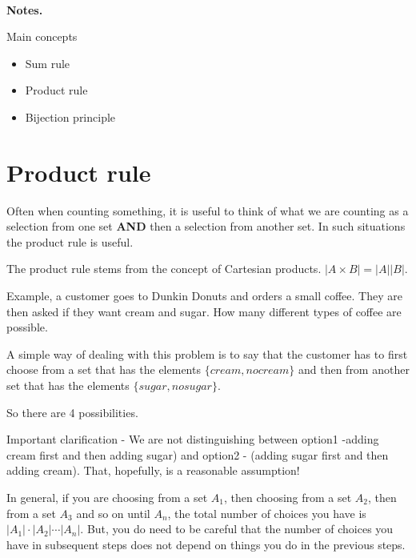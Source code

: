\documentclass[12pt]{article}
\begin{document}
\begin{center}
\\
\vspace{1cm}
\end{center}


\medskip\noindent

{\bf Notes.}

Main concepts

\begin{itemize}
\item Sum rule
\item Product rule
\item Bijection principle
\end{itemize}

\vspace{0.5cm}\noindent

\section*{Product rule}
Often when counting something, it is useful to think of what we are counting as a selection from one set \textbf{AND} then a selection from another set. In such situations the product rule is useful.

The product rule stems from the concept of Cartesian products. $|A \times B| = |A||B|$.
 
Example, a customer goes to Dunkin Donuts and orders a small coffee. They are then asked if they want cream and sugar. How many different types of coffee are possible.

A simple way of dealing with this problem is to say that the customer has to first choose from a set that has the elements $\{cream, no cream\}$ and then from another set that has the elements $\{sugar, no sugar\}$.

So there are 4 possibilities.

Important clarification - We are not distinguishing between option1 -adding cream first and then adding sugar) and option2 - (adding sugar first and then adding cream). That, hopefully, is a reasonable assumption!

In general, if you are choosing from a set $A_1$, then choosing from a set $A_2$, then from a set $A_3$ and so on until $A_n$, the total number of choices you have is $|A_1|\cdot |A_2|\cdots |A_n|$.
But, you do need to be careful that the number of choices you have in subsequent steps does not depend on things you do in the previous steps. 
\end{document}
